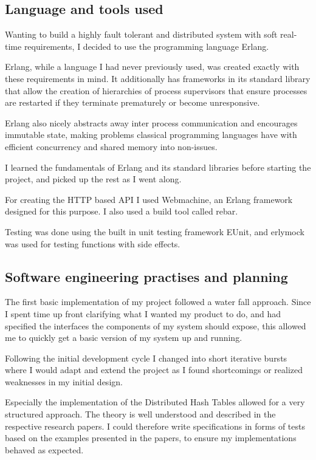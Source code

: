 \subsection{Language and tools used}
Wanting to build a highly fault tolerant and distributed system with soft real-time requirements, I decided to use the programming language Erlang.

Erlang, while a language I had never previously used, was created exactly with these requirements in mind. It additionally has frameworks in its standard library that allow the creation of hierarchies of process supervisors that ensure processes are restarted if they terminate prematurely or become unresponsive.

Erlang also nicely abstracts away inter process communication and encourages immutable state, making problems classical programming languages have with efficient concurrency and shared memory into non-issues.

I learned the fundamentals of Erlang and its standard libraries before starting the project, and picked up the rest as I went along.

For creating the HTTP based API I used Webmachine, an Erlang framework designed for this purpose. I also used a build tool called rebar.

Testing was done using the built in unit testing framework EUnit, and erlymock was used for testing functions with side effects.

\subsection{Software engineering practises and planning}
The first basic implementation of my project followed a water fall approach. Since I spent time up front clarifying  what I wanted my product to do, and had specified the interfaces the components of my system should expose, this allowed me to quickly get a basic version of my system up and running.

Following the initial development cycle I changed into short iterative bursts where I would adapt and extend the project as I found shortcomings or realized weaknesses in my initial design.

Especially the implementation of the Distributed Hash Tables allowed for a very structured approach. The theory is well understood and described in the respective research papers. I could therefore write specifications in forms of tests based on the examples presented in the papers, to ensure my implementations behaved as expected.

